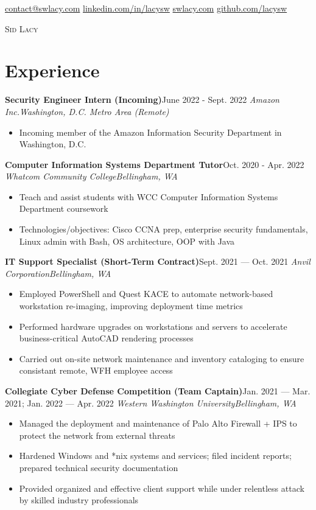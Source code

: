 \documentclass{article}
\newcommand{\alignicon}[2][nmbr]{\eqmakebox[#1]{\strut #2}}
\newcommand{\topLevelItem}[4]{
    \textbf{#1}\hfill #4\newline
    \emph{#2\hfill #3}\newline
    \vspace{-18pt}\begin{itemize}
}
\newcommand{\topLevelItemEnd}{\end{itemize}\vspace{5pt}}
\newcommand{\lowLevelItem}[1]{
    \item\small{#1}\vspace{-8pt}
}
\begin{document}
    \begin{center}
        \noindent\alignicon\faEnvelope\quad\href{mailto:contact@swlacy.com}{contact@swlacy.com}\hfill %
        \href{https://linkedin.com/in/lacysw}{linkedin.com/in/lacysw}\quad\alignicon\faLinkedin\newline %
        \alignicon\faGlobe\quad\href{https://swlacy.com}{swlacy.com}\hfill %
        \href{https://github.com/lacysw}{github.com/lacysw}\quad\alignicon\faGithub\vspace*{-0.33in} %
        
        {\fontsize{28}{0}\selectfont\scshape Sid Lacy}\vspace{5pt}
    \end{center}
    
    \section*{Experience}
        \topLevelItem{Security Engineer Intern (Incoming)}{Amazon Inc.}{Washington, D.C. Metro Area (Remote)}{June 2022 - Sept. 2022}
            \lowLevelItem{Incoming member of the Amazon Information Security Department in Washington, D.C.}
        \topLevelItemEnd
        \topLevelItem{Computer Information Systems Department Tutor}{Whatcom Community College}{Bellingham, WA}{Oct. 2020 - Apr. 2022}
            \lowLevelItem{Teach and assist students with WCC Computer Information Systems Department coursework}
            \lowLevelItem{Technologies/objectives: Cisco CCNA prep, enterprise security fundamentals, Linux admin with Bash, OS architecture, OOP with Java}
        \topLevelItemEnd
        \topLevelItem{IT Support Specialist (Short-Term Contract)}{Anvil Corporation}{Bellingham, WA}{Sept. 2021 — Oct. 2021}
            \lowLevelItem{Employed PowerShell and Quest KACE to automate network-based workstation re-imaging, improving deployment time metrics}
            \lowLevelItem{Performed hardware upgrades on workstations and servers to accelerate business-critical AutoCAD rendering processes}
            \lowLevelItem{Carried out on-site network maintenance and inventory cataloging to ensure consistant remote, WFH employee access}
        \topLevelItemEnd
        \topLevelItem{Collegiate Cyber Defense Competition (Team Captain)}{Western Washington University}{Bellingham, WA}{Jan. 2021 — Mar. 2021; Jan. 2022 — Apr. 2022}
            \lowLevelItem{Managed the deployment and maintenance of Palo Alto Firewall + IPS to protect the network from external threats}
            \lowLevelItem{Hardened Windows and *nix systems and services; filed incident reports; prepared technical security documentation}
            \lowLevelItem{Provided organized and effective client support while under relentless attack by skilled industry professionals}
        \topLevelItemEnd
        
\end{document}
